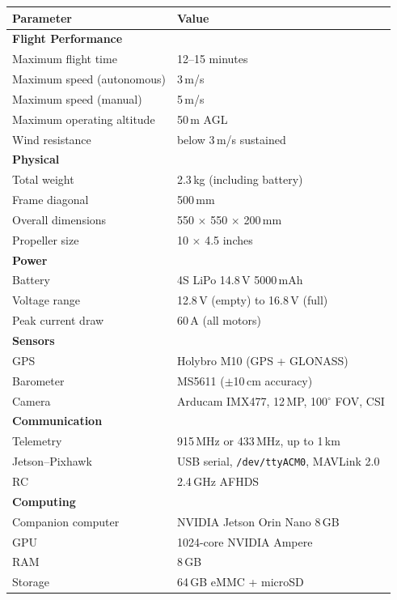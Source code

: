 \documentclass{article}
\begin{document}
\begin{tabular}{ll}
\toprule
\textbf{Parameter} & \textbf{Value} \\
\midrule
\multicolumn{2}{l}{\textbf{Flight Performance}} \\
Maximum flight time & 12--15 minutes \\
Maximum speed (autonomous) & 3\,m/s \\
Maximum speed (manual) & 5\,m/s \\
Maximum operating altitude & 50\,m AGL \\
Wind resistance & below 3\,m/s sustained \\
\midrule
\multicolumn{2}{l}{\textbf{Physical}} \\
Total weight & 2.3\,kg (including battery) \\
Frame diagonal & 500\,mm \\
Overall dimensions & 550 $\times$ 550 $\times$ 200\,mm \\
Propeller size & 10 $\times$ 4.5 inches \\
\midrule
\multicolumn{2}{l}{\textbf{Power}} \\
Battery & 4S LiPo 14.8\,V 5000\,mAh \\
Voltage range & 12.8\,V (empty) to 16.8\,V (full) \\
Peak current draw & 60\,A (all motors) \\
\midrule
\multicolumn{2}{l}{\textbf{Sensors}} \\
GPS & Holybro M10 (GPS + GLONASS) \\
Barometer & MS5611 ($\pm$10\,cm accuracy) \\
Camera & Arducam IMX477, 12\,MP, 100$^\circ$ FOV, CSI \\
\midrule
\multicolumn{2}{l}{\textbf{Communication}} \\
Telemetry & 915\,MHz or 433\,MHz, up to 1\,km \\
Jetson--Pixhawk & USB serial, \texttt{/dev/ttyACM0}, MAVLink 2.0 \\
RC & 2.4\,GHz AFHDS \\
\midrule
\multicolumn{2}{l}{\textbf{Computing}} \\
Companion computer & NVIDIA Jetson Orin Nano 8\,GB \\
GPU & 1024-core NVIDIA Ampere \\
RAM & 8\,GB \\
Storage & 64\,GB eMMC + microSD \\
\bottomrule
\end{tabular}
\end{document}
